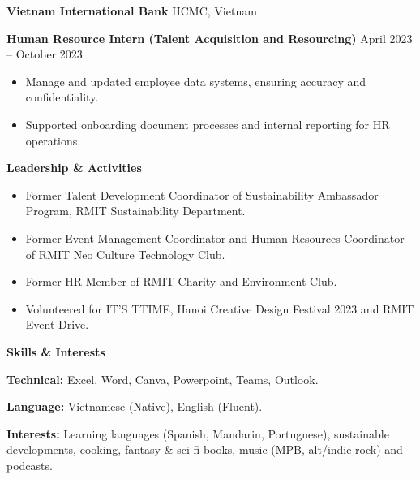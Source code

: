 \documentclass[10pt]{article}
\begin{document}
\textbf{Vietnam International Bank} \hfill HCMC, Vietnam

\textbf{Human Resource Intern (Talent Acquisition and Resourcing)} \hfill April 2023 – October 2023
\begin{itemize}[noitemsep, topsep=0pt, partopsep=0pt, parsep=0pt]
    \item Manage and updated employee data systems, ensuring accuracy and confidentiality.
    \item Supported onboarding document processes and internal reporting for HR operations.
\end{itemize}

\begin{center}
    \textbf{Leadership \& Activities}
\end{center}

\begin{itemize}[noitemsep, topsep=0pt, partopsep=0pt, parsep=0pt]
    \item Former Talent Development Coordinator of Sustainability Ambassador Program, RMIT Sustainability Department.
    \item Former Event Management Coordinator and Human Resources Coordinator of RMIT Neo Culture Technology Club.
    \item Former HR Member of RMIT Charity and Environment Club.
    \item Volunteered for IT’S TTIME, Hanoi Creative Design Festival 2023 and RMIT Event Drive.
\end{itemize}

\begin{center}
    \textbf{Skills \& Interests}
\end{center}

\textbf{Technical:} Excel, Word, Canva, Powerpoint, Teams, Outlook.

\textbf{Language:} Vietnamese (Native), English (Fluent).

\textbf{Interests:} Learning languages (Spanish, Mandarin, Portuguese), sustainable developments, cooking, fantasy \& sci-fi books, music (MPB, alt/indie rock) and podcasts.
\end{document}

